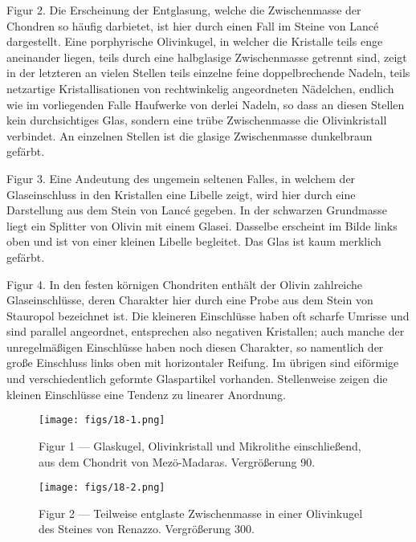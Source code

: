\documentclass[a4paper, 12pt, oneside]{article}
\begin{document}
Figur 2. Die Erscheinung der Entglasung, welche die Zwischenmasse der Chondren so häufig darbietet, ist hier durch einen Fall im Steine von Lancé dargestellt. Eine porphyrische Olivinkugel, in welcher die Kristalle teils enge aneinander liegen, teils durch eine halbglasige Zwischenmasse getrennt sind, zeigt in der letzteren an vielen Stellen teils einzelne feine doppelbrechende Nadeln, teils netzartige Kristallisationen von rechtwinkelig angeordneten Nädelchen, endlich wie im vorliegenden Falle Haufwerke von derlei Nadeln, so dass an diesen Stellen kein durchsichtiges Glas, sondern eine trübe Zwischenmasse die Olivinkristall verbindet. An einzelnen Stellen ist die glasige Zwischenmasse dunkelbraun gefärbt.

Figur 3. Eine Andeutung des ungemein seltenen Falles, in welchem der Glaseinschluss in den Kristallen eine Libelle zeigt, wird hier durch eine Darstellung aus dem Stein von Lancé gegeben. In der schwarzen Grundmasse liegt ein Splitter von Olivin mit einem Glasei. Dasselbe erscheint im Bilde links oben und ist von einer kleinen Libelle begleitet. Das Glas ist kaum merklich gefärbt.

Figur 4. In den festen körnigen Chondriten enthält der Olivin zahlreiche Glaseinschlüsse, deren Charakter hier durch eine Probe aus dem Stein von Stauropol bezeichnet ist. Die kleineren Einschlüsse haben oft scharfe Umrisse und sind parallel angeordnet, entsprechen also negativen Kristallen; auch manche der unregelmäßigen Einschlüsse haben noch diesen Charakter, so namentlich der große Einschluss links oben mit horizontaler Reifung. Im übrigen sind eiförmige und verschiedentlich geformte Glaspartikel vorhanden. Stellenweise zeigen die kleinen Einschlüsse eine Tendenz zu linearer Anordnung.
\clearpage

\vspace*{\fill}
\begin{figure}[H]
\centering
\texttt{[image: figs/18-1.png]}
\caption{\small Figur 1 --- Glaskugel, Olivinkristall und Mikrolithe einschließend, aus dem Chondrit von Mezö-Madaras. Vergrößerung 90.}
\end{figure}
\vspace*{\fill}
\clearpage

\vspace*{\fill}
\begin{figure}[H]
\centering
\texttt{[image: figs/18-2.png]}
\caption{\small Figur 2 --- Teilweise entglaste Zwischenmasse in einer Olivinkugel des Steines von Renazzo. Vergrößerung 300.}
\end{figure}
\vspace*{\fill}
\clearpage
\end{document}
